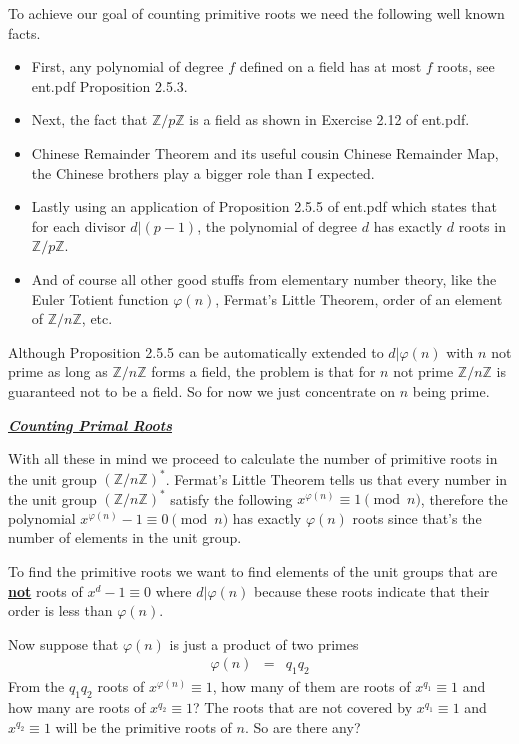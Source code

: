\documentclass[aps,preprint,preprintnumbers,nofootinbib,showpacs,prd]{revtex4-1}
\newcommand{\bit}{\begin{itemize}}
\newcommand{\eit}{\end{itemize}}
\newcommand{\nbea}{\begin{eqnarray*}}
\newcommand{\neea}{\end{eqnarray*}}
\begin{document}
To achieve our goal of counting primitive roots we need the following well known facts.
\bit
%
\item First, any polynomial of degree $f$ defined on a field has at most $f$ roots, see ent.pdf Proposition 2.5.3.
%
\item Next, the fact that $\mathbb{Z}/p\mathbb{Z}$ is a field as shown in Exercise 2.12 of ent.pdf.
%
\item Chinese Remainder Theorem and its useful cousin Chinese Remainder Map, the Chinese brothers play a bigger role than I expected.
%
\item Lastly using an application of Proposition 2.5.5 of ent.pdf which states that for each divisor $d|(p-1)$, the polynomial of degree $d$ has exactly $d$ roots in $\mathbb{Z}/p\mathbb{Z}$.
%
\item And of course all other good stuffs from elementary number theory, like the Euler Totient function $\varphi(n)$, Fermat's Little Theorem, order of an element of $\mathbb{Z}/n\mathbb{Z}$, etc.
%
\eit
%
Although Proposition 2.5.5 can be automatically extended to $d|\varphi(n)$ with $n$ not prime as long as $\mathbb{Z}/n\mathbb{Z}$ forms a field, the problem is that for $n$ not prime $\mathbb{Z}/n\mathbb{Z}$ is guaranteed not to be a field. So for now we just concentrate on $n$ being prime.

\bigskip
\underline{\textit{\textbf{Counting Primal Roots}}}
\bigskip

With all these in mind we proceed to calculate the number of primitive roots in the unit group $(\mathbb{Z}/n\mathbb{Z})^*$. Fermat's Little Theorem tells us that every number in the unit group $(\mathbb{Z}/n\mathbb{Z})^*$ satisfy the following $x^{\varphi(n)} \equiv 1 \pmod{n}$, therefore the polynomial $x^{\varphi(n)} - 1 \equiv 0 \pmod{n}$ has exactly $\varphi(n)$ roots since that's the number of elements in the unit group.

To find the primitive roots we want to find elements of the unit groups that are \underline{{\bf not}} roots of $x^d - 1 \equiv 0$ where $d|\varphi(n)$ because these roots indicate that their order is less than $\varphi(n)$.

Now suppose that $\varphi(n)$ is just a product of two primes
%
\nbea
\varphi(n) & = & q_1q_2
\neea
%
From the $q_1q_2$ roots of $x^{\varphi(n)} \equiv 1$, how many of them are roots of $x^{q_1} \equiv 1$ and how many are roots of $x^{q_2} \equiv 1$? The roots that are not covered by $x^{q_{1}} \equiv 1$ and $x^{q_{2}} \equiv 1$ will be the primitive roots of $n$. So are there any?
\end{document}
